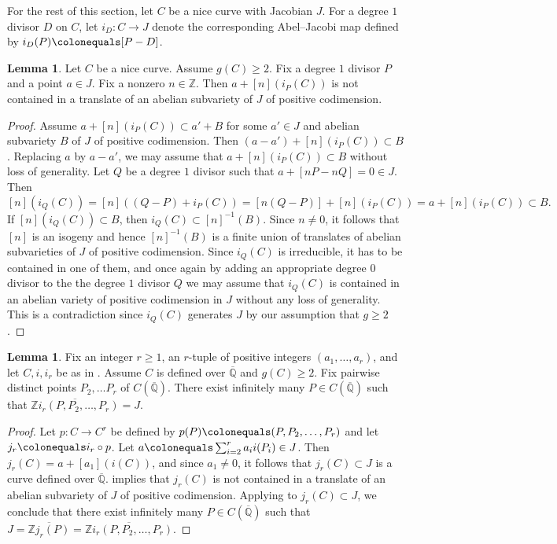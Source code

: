 \documentclass[reqno,10pt]{amsart}
\theoremstyle{definition}
\theoremstyle{definition}
\newtheorem{lem}[thm]{Lemma}
\def\Z{{\mathbb Z}}
\def\Qbar{\overline{\mathbb{Q}}}
\begin{document}
For the rest of this section, let $C$ be a nice curve with Jacobian $J$. For a degree $1$ divisor $D$ on $C$, let $i_D \colon C \rightarrow J$ denote the corresponding Abel--Jacobi map defined by $i_D(P) \colonequals [P-D]$. 
\begin{lem}\label{lem:abeliantranslate}
Let $C$ be a nice curve. Assume $g(C)\geq 2$. Fix a degree $1$ divisor $P$ and a point $a  \in J$. Fix a nonzero $n\in \Z$. Then $a+[n](i_{P}(C))$ is not contained in a translate of an abelian subvariety of $J$ of positive codimension.
\end{lem}
\begin{proof} 
Assume $a+[n](i_{P}(C)) \subset a'+B$ for some $a' \in J$ and abelian subvariety $B$ of $J$ of positive codimension. Then $(a-a')+[n](i_{P}(C)) \subset B$. Replacing $a$ by $a-a'$, we may assume that $a+[n](i_{P}(C)) \subset B$ without loss of generality. Let $Q$ be a degree $1$ divisor such that $a+[nP-nQ] = 0 \in J$. Then
\[ [n](i_{Q}(C)) = [n]((Q-P)+i_{P}(C)) = [n(Q-P)]+[n](i_{P}(C)) = a+[n](i_{P}(C)) \subset B.\]
If $[n](i_{Q}(C)) \subset B$, then $i_{Q}(C) \subset [n]^{-1}(B)$. Since $n \neq 0$, it follows that $[n] $ is an isogeny and hence $[n]^{-1}(B)$ is a finite union of translates of abelian subvarieties of $J$ of positive codimension. Since $i_{Q}(C)$ is irreducible, it has to be contained in one of them, and once again by adding an appropriate degree $0$ divisor to the the degree $1$ divisor $Q$ we may assume that $i_{Q}(C)$ is contained in an abelian variety of positive codimension in $J$ without any loss of generality. This is a contradiction since $i_Q(C)$ generates $J$ by our assumption that $g \geq 2$.
\end{proof}



 
\begin{lem}\label{lem:infintepoints}Fix an integer $r \geq 1$, an $r$-tuple of positive integers $(a_1,\ldots,a_r)$, and let $C,i,i_r$ be as in . Assume $C$ is defined over $\Qbar$ and $g(C) \geq 2$. Fix pairwise distinct points $P_2,\dots P_r$ of $C(\Qbar)$. There exist infinitely many $P \in C(\Qbar)$ such that $\overline{\Z i_r(P,P_2,\ldots,P_r)} = J$.  
\end{lem}
\begin{proof}
Let $p \colon C\rightarrow C^r$ be defined by $p(P) \colonequals (P,P_2,\dots, P_r)$ and let $j_r \colonequals i_r \circ p$. Let $a \colonequals \sum_{i=2}^r a_i i(P_i) \in J$. Then $j_r(C) = a + [a_1](i(C))$, and since $a_1 \neq 0$, it follows that $j_r(C) \subset J$ is a curve defined over $\Qbar$.  implies that $j_r(C)$ is not contained in a translate of an abelian subvariety of $J$ of positive codimension. Applying  to $j_r(C) \subset J$, we conclude that there exist infinitely many $P \in C(\Qbar)$ such that $J = \overline{\Z j_r(P)} = \overline{\Z i_r(P,P_2,\ldots,P_r)}.$\end{proof}
\end{document}
